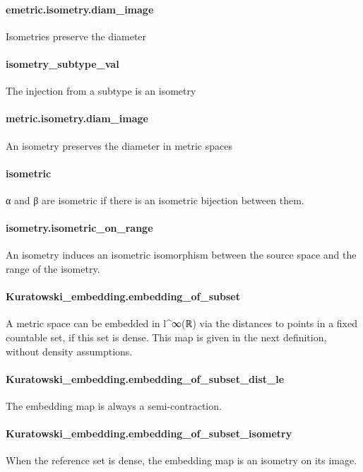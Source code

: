 \documentclass{article}
\begin{document}
\paragraph{emetric.isometry.diam\_image}
\par
Isometries preserve the diameter
\paragraph{isometry\_subtype\_val}
\par
The injection from a subtype is an isometry
\paragraph{metric.isometry.diam\_image}
\par
An isometry preserves the diameter in metric spaces
\paragraph{isometric}
\par
α and β are isometric if there is an isometric bijection between them.
\paragraph{isometry.isometric\_on\_range}
\par
An isometry induces an isometric isomorphism between the source space and the
range of the isometry.
\paragraph{Kuratowski\_embedding.embedding\_of\_subset}
\par
A metric space can be embedded in 
\colorbox[RGB]{253,246,227}{{{{\color[RGB]{101, 123, 131} l\textasciicircum{}∞(ℝ) }}}} via the distances to points in
a fixed countable set, if this set is dense. This map is given in the next definition,
without density assumptions.
\paragraph{Kuratowski\_embedding.embedding\_of\_subset\_dist\_le}
\par
The embedding map is always a semi-contraction.
\paragraph{Kuratowski\_embedding.embedding\_of\_subset\_isometry}
\par
When the reference set is dense, the embedding map is an isometry on its image.
\end{document}
